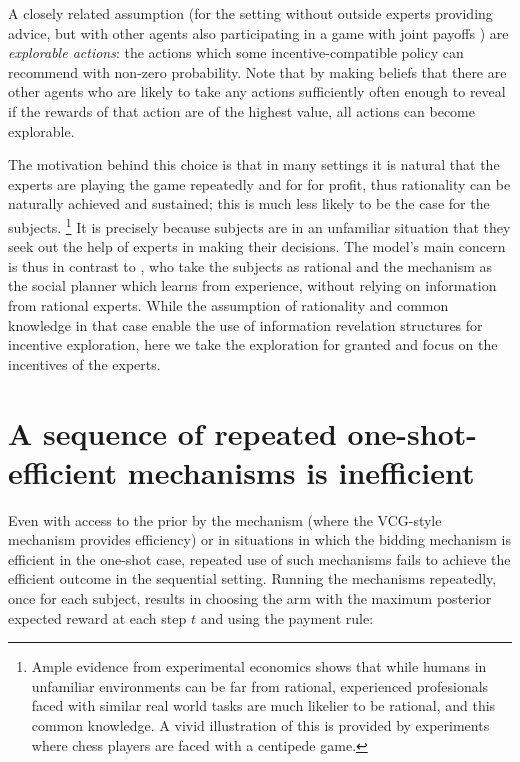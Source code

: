 A closely related assumption (for the setting without outside experts providing advice, but with other agents also participating in a game with joint payoffs \cite{mansour2016bayesian}) are \emph{explorable actions}: the actions which some incentive-compatible policy can recommend with non-zero probability. Note that by making beliefs that there are other agents who are likely to take any actions sufficiently often enough to reveal if the rewards of that action are of the highest value, all actions can become explorable.


The motivation behind this choice is that in many settings it is natural that the experts are playing the game repeatedly and for for profit, thus rationality can be naturally achieved and sustained; this is much less likely to be the case for the subjects.
\footnote{Ample evidence from experimental economics shows that while humans in unfamiliar environments can be far from rational, experienced profesionals faced with similar real world tasks are much likelier to be rational, and this common knowledge. A vivid illustration of this is provided by experiments where chess players are faced with a centipede game.}
It is precisely because subjects are in an unfamiliar situation that they seek out the help of experts in making their decisions.
The model's main concern is thus in contrast to \cite{kremer2014implementing,mansour2015bayesian}, who take the subjects as rational and the mechanism as the social planner which learns from experience, without relying on information from rational experts.
While the assumption of rationality and common knowledge in that case enable the use of information revelation structures for incentive exploration, here we take the exploration for granted and focus on the incentives of the experts.

\section{A sequence of repeated one-shot-efficient mechanisms is inefficient}

Even with access to the prior by the mechanism (where the VCG-style mechanism provides efficiency) or in situations in which the bidding mechanism is efficient in the one-shot case, repeated use of such mechanisms fails to achieve the efficient outcome in the sequential setting.
Running the mechanisms repeatedly, once for each subject, results in choosing the arm with the maximum posterior expected reward at each step $t$ and using the payment rule:


